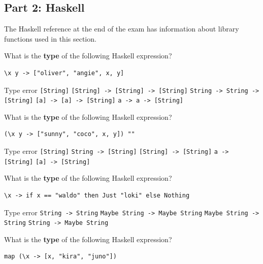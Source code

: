 \documentclass[addpoints]{exam}
\begin{document}
\begin{questions}
\newpage

\subsection*{\textbf{Part 2: Haskell}}

The Haskell reference at the end of the exam has information about library functions used in this section.

\question[4] What is the \textbf{type} of the following Haskell expression?

\begin{verbatim}
\x y -> ["oliver", "angie", x, y]
\end{verbatim}

\begin{checkboxes}
  \choice Type error
  \choice \texttt{[String]}
  \choice \texttt{[String] -> [String] -> [String]}
  \CorrectChoice \texttt{String -> String -> [String]}
  \choice \texttt{[a] -> [a] -> [String]}
  \choice \texttt{a -> a -> [String]}
\end{checkboxes}

\question[4] What is the \textbf{type} of the following Haskell expression?

\begin{verbatim}
(\x y -> ["sunny", "coco", x, y]) ""
\end{verbatim}

\begin{checkboxes}
  \choice Type error
  \choice \texttt{[String]}
  \CorrectChoice \texttt{String -> [String]}
  \choice \texttt{[String] -> [String]}
  \choice \texttt{a -> [String]}
  \choice \texttt{[a] -> [String]}
\end{checkboxes}

\question[4] What is the \textbf{type} of the following Haskell expression?

\begin{verbatim}
\x -> if x == "waldo" then Just "loki" else Nothing
\end{verbatim}

\begin{checkboxes}
  \choice Type error
  \choice \texttt{String -> String}
  \choice \texttt{Maybe String -> Maybe String}
  \choice \texttt{Maybe String -> String}
  \CorrectChoice \texttt{String -> Maybe String}    
\end{checkboxes}

\question[4] What is the \textbf{type} of the following Haskell expression?

\begin{verbatim}
map (\x -> [x, "kira", "juno"])
\end{verbatim}


\end{questions}
\end{document}
